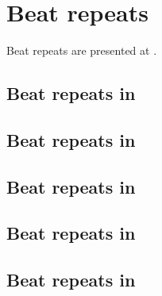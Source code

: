 



\chapter{Beat repeats}\label{Beat repeats}

Beat repeats are presented at .


\section{Beat repeats in \mxsrToMsr{}}


\section{Beat repeats in \mxsrToMsr{}}


\section{Beat repeats in \msrToMsr{}}


\section{Beat repeats in \msrToLpsr{}}


\section{Beat repeats in \lpsrToLilypond{}}



